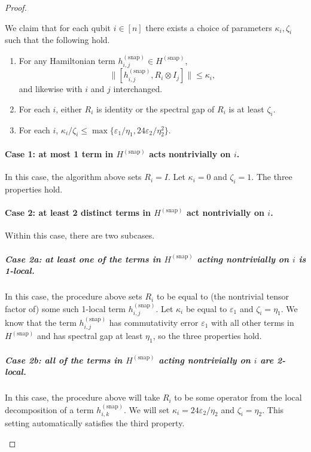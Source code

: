 \documentclass[a4paper,onecolumn,11pt]{quantumarticle}
\theoremstyle{plain}
\newcommand{\eps}{\varepsilon}
\newcommand{\snp}{{(\mathrm{snap})}}
\begin{document}
\begin{proof}
\begin{enumerate}
\begin{enumerate}
    \end{enumerate}
    We claim that for each qubit $i \in [n]$ there exists a choice of parameters $\kappa_i, \zeta_i$ such that the following hold.
    \begin{enumerate}
        \item[1.] For any Hamiltonian term $h^\snp_{i,j} \in H^\snp$,
        \[ \|[ h^\snp_{i,j}, R_i \otimes I_j] \| \leq \kappa_i, \]
        and likewise with $i$ and $j$ interchanged.
        \item[2.] For each $i$, either $R_i$ is identity or the spectral gap of $R_i$ is at least $\zeta_i$.
        \item[3.] For each $i$, $\kappa_i/\zeta_i \leq \max\{ \eps_1 /\eta_1, 24\eps_2/\eta_2^2\}$.
    \end{enumerate}
    
    \paragraph{Case 1: at most 1 term in $H^\snp$ acts nontrivially on $i$.} In this case, the algorithm above sets $R_i = I$. Let $\kappa_i = 0$ and $\zeta_i = 1$. The three properties hold.


\paragraph{Case 2: at least 2 distinct terms in $H^\snp$ act nontrivially on $i$.}

Within this case, there are two subcases.

\subparagraph{Case 2a: at least one of the terms in $H^\snp$ acting nontrivially on $i$ is 1-local.}

In this case, the procedure above sets $R_i$ to be equal to (the nontrivial tensor factor of) some such 1-local term $h^\snp_{i,j}$. Let $\kappa_i$ be equal to $\eps_1$ and $\zeta_i = \eta_1$. We know that the term $h^\snp_{i,j}$ has commutativity error $\eps_1$ with all other terms in $H^\snp$ and has spectral gap at least $\eta_1$, so the three properties hold.

\subparagraph{Case 2b: all of the terms in $H^\snp$ acting nontrivially on $i$ are 2-local.}

In this case, the procedure above will take $R_i$ to be some operator from the local decomposition of a term $h^\snp_{i,k}$. We will set $\kappa_i = 24\eps_2/\eta_2$ and $\zeta_i = \eta_2$. This setting automatically satisfies the third property.


\end{enumerate}
\end{proof}
\end{document}
